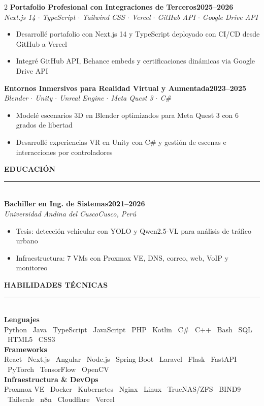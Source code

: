 \documentclass[letterpaper,10pt]{article}
\newcommand{\rsection}[1]{%
  {\vspace{2pt}\color{accentblue}\bfseries\normalsize\MakeUppercase{#1}}\\[-2pt]
  {\color{cvline}\rule{\linewidth}{0.6pt}}\\[1pt]
}
\newcommand{\cvcertfull}[4]{%
  \vspace{2pt}
  {\footnotesize\textbf{#1}\hfill\footnotesize\textbf{#2}}\\
  {\scriptsize\color{graytext}\textit{#3}\hfill\scriptsize\color{graytext}\textit{#4}}
  \vspace{0pt}
}
\newcommand{\cvproject}[3]{%
  \vspace{3pt}
  {\small\textbf{#1}}\hfill{\small\textbf{#2}}\\
  {\footnotesize\color{accentblue}\textit{#3}}
  \vspace{1pt}
}
\newcommand{\cvbullet}{\begin{itemize}[leftmargin=0.15in,itemsep=-1pt,topsep=1pt]}
\newcommand{\cvbulletend}{\end{itemize}\vspace{2pt}}
\newcommand{\skillrow}[2]{%
  {\footnotesize\textbf{#1}}\\
  {\scriptsize\color{graytext}#2}\\[3pt]
}
\begin{document}
\begin{paracol}{2}
\cvproject{Portafolio Profesional con Integraciones de Terceros}{2025--2026}
{Next.js 14 $\cdot$ TypeScript $\cdot$ Tailwind CSS $\cdot$ Vercel $\cdot$ GitHub API $\cdot$ Google Drive API}
\cvbullet
  \item[\small\textbullet] Desarroll\'e portafolio con Next.js 14 y TypeScript deployado con CI/CD desde GitHub a Vercel
  \item[\small\textbullet] Integr\'e GitHub API, Behance embeds y certificaciones din\'amicas via Google Drive API
\cvbulletend

\cvproject{Entornos Inmersivos para Realidad Virtual y Aumentada}{2023--2025}
{Blender $\cdot$ Unity $\cdot$ Unreal Engine $\cdot$ Meta Quest 3 $\cdot$ C\#}
\cvbullet
  \item[\small\textbullet] Model\'e escenarios 3D en Blender optimizados para Meta Quest 3 con 6 grados de libertad
  \item[\small\textbullet] Desarroll\'e experiencias VR en Unity con C\# y gesti\'on de escenas e interacciones por controladores
\cvbulletend

\switchcolumn

\rsection{Educaci\'on}

\cvcertfull{Bachiller en Ing. de Sistemas}{2021--2026}
{Universidad Andina del Cusco}{Cusco, Per\'u}
\cvbullet
  \item[\small\textbullet] Tesis: detecci\'on vehicular con YOLO y Qwen2.5-VL para an\'alisis de tr\'afico urbano
  \item[\small\textbullet] Infraestructura: 7 VMs con Proxmox VE, DNS, correo, web, VoIP y monitoreo
\cvbulletend

\vspace{2pt}
\rsection{Habilidades T\'ecnicas}

\skillrow{Lenguajes}{Python \textbullet\ Java \textbullet\ TypeScript \textbullet\ JavaScript \textbullet\ PHP \textbullet\ Kotlin \textbullet\ C\# \textbullet\ C++ \textbullet\ Bash \textbullet\ SQL \textbullet\ HTML5 \textbullet\ CSS3}

\skillrow{Frameworks}{React \textbullet\ Next.js \textbullet\ Angular \textbullet\ Node.js \textbullet\ Spring Boot \textbullet\ Laravel \textbullet\ Flask \textbullet\ FastAPI \textbullet\ PyTorch \textbullet\ TensorFlow \textbullet\ OpenCV}

\skillrow{Infraestructura \& DevOps}{Proxmox VE \textbullet\ Docker \textbullet\ Kubernetes \textbullet\ Nginx \textbullet\ Linux \textbullet\ TrueNAS/ZFS \textbullet\ BIND9 \textbullet\ Tailscale \textbullet\ n8n \textbullet\ Cloudflare \textbullet\ Vercel}


\end{paracol}
\end{document}

